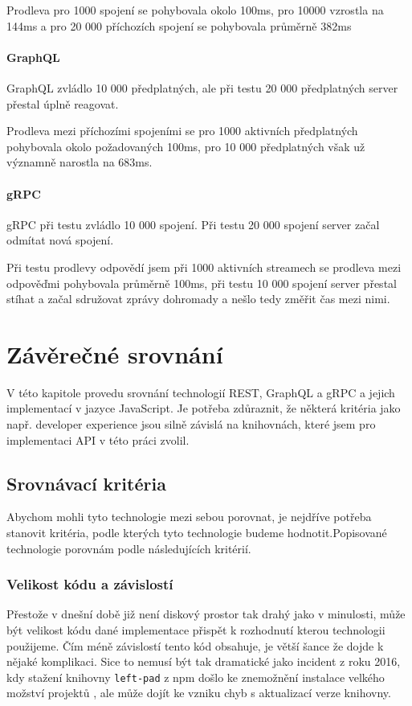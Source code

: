 \documentclass[thesis=M,czech]{FITthesis}[2019/12/23]
\begin{document}
Prodleva pro 1000 spojení se pohybovala okolo 100ms, pro 10000 vzrostla na 144ms a pro 20 000 příchozích spojení se pohybovala průměrně 382ms

\subsubsection*{GraphQL}
GraphQL zvládlo 10 000 předplatných, ale při testu 20 000 předplatných server přestal úplně reagovat.

Prodleva mezi příchozími spojeními se pro 1000 aktivních předplatných pohybovala okolo požadovaných 100ms, pro 10 000 předplatných však už významně narostla na 683ms.

\subsubsection*{gRPC}
gRPC při testu zvládlo 10 000 spojení. Při testu 20 000 spojení server začal odmítat nová spojení.

Při testu prodlevy odpovědí jsem při 1000 aktivních streamech se prodleva mezi odpověďmi pohybovala průměrně 100ms, při testu 10 000 spojení server přestal stíhat a začal sdružovat zprávy dohromady a nešlo tedy změřit čas mezi nimi. 

\chapter{Závěrečné srovnání}
V této kapitole provedu srovnání technologií REST, GraphQL a gRPC a jejich implementací v jazyce JavaScript. Je potřeba zdůraznit, že některá kritéria jako např. developer experience jsou silně závislá na knihovnách, které jsem pro implementaci API v této práci zvolil.


\section{Srovnávací kritéria}
Abychom mohli tyto technologie mezi sebou porovnat, je nejdříve potřeba stanovit kritéria, podle kterých tyto technologie budeme hodnotit.Popisované technologie porovnám podle následujících kritérií.

\subsection{Velikost kódu a závislostí}
Přestože v dnešní době již není diskový prostor tak drahý jako v minulosti, může být velikost kódu dané implementace přispět k rozhodnutí kterou technologii použijeme. Čím méně závislostí tento kód obsahuje, je větší šance že dojde k nějaké komplikaci. Sice to nemusí být tak dramatické jako incident z roku 2016, kdy stažení knihovny \texttt{left-pad} z npm došlo ke znemožnění instalace velkého možství projektů \cite{left_pad},  ale může dojít ke vzniku chyb s aktualizací verze knihovny.
\end{document}
